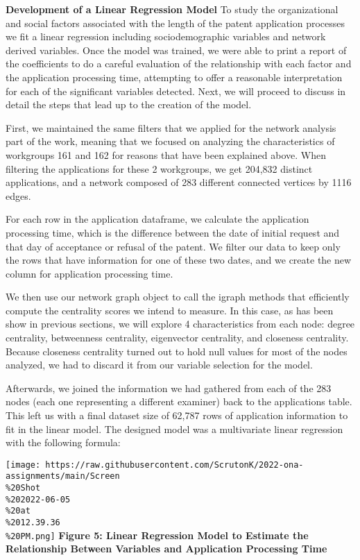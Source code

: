\documentclass[
]{article}
\begin{document}
\textbf{Development of a Linear Regression Model} To study the
organizational and social factors associated with the length of the
patent application processes we fit a linear regression including
sociodemographic variables and network derived variables. Once the model
was trained, we were able to print a report of the coefficients to do a
careful evaluation of the relationship with each factor and the
application processing time, attempting to offer a reasonable
interpretation for each of the significant variables detected. Next, we
will proceed to discuss in detail the steps that lead up to the creation
of the model.

First, we maintained the same filters that we applied for the network
analysis part of the work, meaning that we focused on analyzing the
characteristics of workgroups 161 and 162 for reasons that have been
explained above. When filtering the applications for these 2 workgroups,
we get 204,832 distinct applications, and a network composed of 283
different connected vertices by 1116 edges.

For each row in the application dataframe, we calculate the application
processing time, which is the difference between the date of initial
request and that day of acceptance or refusal of the patent. We filter
our data to keep only the rows that have information for one of these
two dates, and we create the new column for application processing time.

We then use our network graph object to call the igraph methods that
efficiently compute the centrality scores we intend to measure. In this
case, as has been show in previous sections, we will explore 4
characteristics from each node: degree centrality, betweenness
centrality, eigenvector centrality, and closeness centrality. Because
closeness centrality turned out to hold null values for most of the
nodes analyzed, we had to discard it from our variable selection for the
model.

Afterwards, we joined the information we had gathered from each of the
283 nodes (each one representing a different examiner) back to the
applications table. This left us with a final dataset size of 62,787
rows of application information to fit in the linear model. The designed
model was a multivariate linear regression with the following formula:

\texttt{[image: https://raw.githubusercontent.com/ScrutonK/2022-ona-assignments/main/Screen\\\%20Shot\\\%202022-06-05\\\%20at\\\%2012.39.36\\\%20PM.png]}
\textbf{Figure 5: Linear Regression Model to Estimate the Relationship
Between Variables and Application Processing Time}
\end{document}
